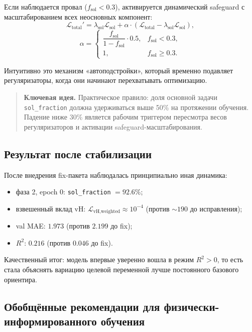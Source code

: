 \documentclass[11pt]{article}
\newcommand{\keyidea}[1]{\begin{quote}\textbf{Ключевая идея.} #1\end{quote}}
\begin{document}
Если наблюдается провал ($f_{\text{sol}}<0.3$), активируется динамический safeguard с масштабированием всех неосновных компонент:
\begin{equation*}
\mathcal{L}_{\text{total}}' = \lambda_{\text{sol}}\mathcal{L}_{\text{sol}} +
\alpha\cdot\left(\mathcal{L}_{\text{total}} - \lambda_{\text{sol}}\mathcal{L}_{\text{sol}}\right),
\end{equation*}
\begin{equation*}
\alpha =
\begin{cases}
\dfrac{f_{\text{sol}}}{1-f_{\text{sol}}}\cdot 0.5, & f_{\text{sol}}<0.3,\\
1, & f_{\text{sol}}\ge 0.3.
\end{cases}
\end{equation*}

Интуитивно это механизм «автоподстройки», который временно подавляет регуляризаторы, когда они начинают перехватывать оптимизацию.

\keyidea{Практическое правило: доля основной задачи \texttt{sol\_fraction} должна удерживаться выше 50\% на протяжении обучения. Падение ниже 30\% является рабочим триггером пересмотра весов регуляризаторов и активации safeguard-масштабирования.}

\subsection{Результат после стабилизации}

После внедрения fix-пакета наблюдалась принципиально иная динамика:
\begin{itemize}
  \item фаза 2, epoch 0: \texttt{sol\_fraction} $=92.6\%$;
  \item взвешенный вклад vH: $\mathcal{L}_{\text{vH,weighted}}\approx 10^{-4}$ (против $\sim 190$ до исправления);
  \item val MAE: $1.973$ (против $2.199$ до fix);
  \item $R^2$: $0.216$ (против $0.046$ до fix).
\end{itemize}

Качественный итог: модель впервые уверенно вошла в режим $R^2>0$, то есть стала объяснять вариацию целевой переменной лучше постоянного базового ориентира.

\subsection{Обобщённые рекомендации для физически-информированного обучения}
\end{document}
